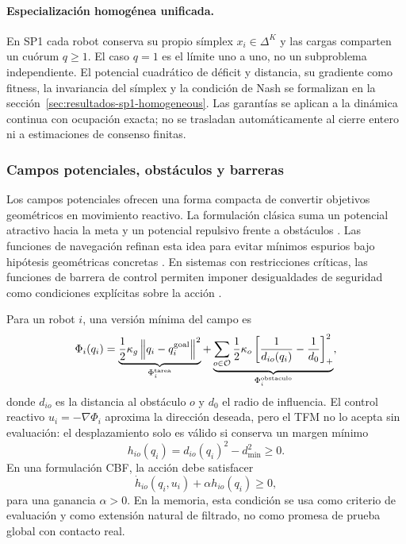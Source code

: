 \paragraph{Especialización homogénea unificada.}
En SP1 cada robot conserva su propio símplex $x_i\in\Delta^K$ y las cargas comparten
un cuórum $q\geq1$. El caso $q=1$ es el límite uno a uno, no un subproblema
independiente. El potencial cuadrático de déficit y distancia, su gradiente como
fitness, la invariancia del símplex y la condición de Nash se formalizan en la
sección~\ref{sec:resultados-sp1-homogeneous}. Las garantías se aplican a la dinámica
continua con ocupación exacta; no se trasladan automáticamente al cierre entero ni a
estimaciones de consenso finitas.

\subsubsection{Campos potenciales, obstáculos y barreras}

Los campos potenciales ofrecen una forma compacta de convertir objetivos geométricos en
movimiento reactivo. La formulación clásica suma un potencial atractivo hacia la meta y
un potencial repulsivo frente a obstáculos \citep{khatib1986real}. Las funciones de
navegación refinan esta idea para evitar mínimos espurios bajo hipótesis geométricas
concretas \citep{rimon1992exact}. En sistemas con restricciones críticas, las funciones
de barrera de control permiten imponer desigualdades de seguridad como condiciones
explícitas sobre la acción \citep{ames2017cbf}.

Para un robot $i$, una versión mínima del campo es
\[
  \Phi_i(q_i)=
  \underbrace{\frac{1}{2}\kappa_g\left\lVert q_i-q_i^{\rm goal}\right\rVert^2}_{\Phi_i^{\rm tarea}}
  +
  \underbrace{
  \sum_{o\in\mathcal O}
  \frac{1}{2}\kappa_o
  \left[\frac{1}{d_{io}(q_i)}-\frac{1}{d_0}\right]_{+}^2
  }_{\Phi_i^{\rm obstaculo}},
\]
donde $d_{io}$ es la distancia al obstáculo $o$ y $d_0$ el radio de influencia. El
control reactivo $u_i=-\nabla\Phi_i$ aproxima la dirección deseada, pero el TFM no lo
acepta sin evaluación: el desplazamiento solo es válido si conserva un margen mínimo
\[
  h_{io}(q_i)=d_{io}(q_i)^2-d_{\min}^2\geq 0 .
\]
En una formulación CBF, la acción debe satisfacer
\[
  \dot h_{io}(q_i,u_i)+\alpha h_{io}(q_i)\geq 0,
\]
para una ganancia $\alpha>0$. En la memoria, esta condición se usa como
criterio de evaluación y como extensión natural de filtrado, no como promesa de prueba
global con contacto real.



